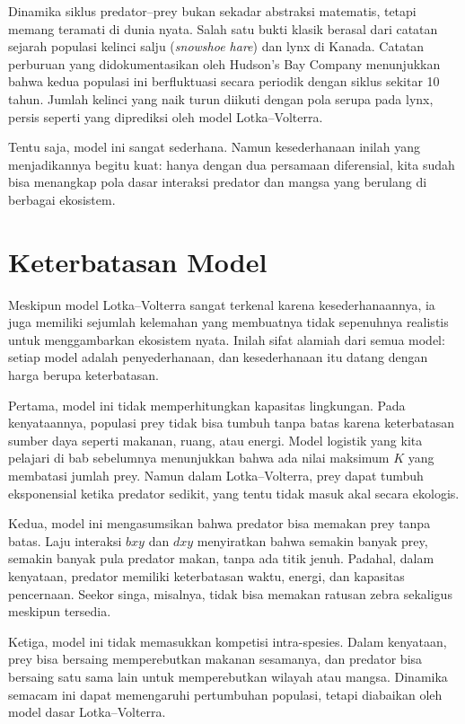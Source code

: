 \documentclass{bukumjh}
\begin{document}
Dinamika siklus predator–prey bukan sekadar abstraksi matematis, tetapi memang teramati di dunia nyata. Salah satu bukti klasik berasal dari catatan sejarah populasi kelinci salju (\textit{snowshoe hare}) dan lynx di Kanada. Catatan perburuan yang didokumentasikan oleh Hudson’s Bay Company menunjukkan bahwa kedua populasi ini berfluktuasi secara periodik dengan siklus sekitar 10 tahun. Jumlah kelinci yang naik turun diikuti dengan pola serupa pada lynx, persis seperti yang diprediksi oleh model Lotka–Volterra.

Tentu saja, model ini sangat sederhana. Namun kesederhanaan inilah yang menjadikannya begitu kuat: hanya dengan dua persamaan diferensial, kita sudah bisa menangkap pola dasar interaksi predator dan mangsa yang berulang di berbagai ekosistem.

\section{Keterbatasan Model}

Meskipun model Lotka–Volterra sangat terkenal karena kesederhanaannya, ia juga memiliki sejumlah kelemahan yang membuatnya tidak sepenuhnya realistis untuk menggambarkan ekosistem nyata. Inilah sifat alamiah dari semua model: setiap model adalah penyederhanaan, dan kesederhanaan itu datang dengan harga berupa keterbatasan.

Pertama, model ini tidak memperhitungkan {\jsg kapasitas lingkungan}. Pada kenyataannya, populasi prey tidak bisa tumbuh tanpa batas karena keterbatasan sumber daya seperti makanan, ruang, atau energi. Model logistik yang kita pelajari di bab sebelumnya menunjukkan bahwa ada nilai maksimum $K$ yang membatasi jumlah prey. Namun dalam Lotka–Volterra, prey dapat tumbuh eksponensial ketika predator sedikit, yang tentu tidak masuk akal secara ekologis.

Kedua, model ini mengasumsikan bahwa {\jsg predator bisa memakan prey tanpa batas}. Laju interaksi $bxy$ dan $dxy$ menyiratkan bahwa semakin banyak prey, semakin banyak pula predator makan, tanpa ada titik jenuh. Padahal, dalam kenyataan, predator memiliki keterbatasan waktu, energi, dan kapasitas pencernaan. Seekor singa, misalnya, tidak bisa memakan ratusan zebra sekaligus meskipun tersedia.

Ketiga, model ini {\jsg tidak memasukkan kompetisi intra-spesies}. Dalam kenyataan, prey bisa bersaing memperebutkan makanan sesamanya, dan predator bisa bersaing satu sama lain untuk memperebutkan wilayah atau mangsa. Dinamika semacam ini dapat memengaruhi pertumbuhan populasi, tetapi diabaikan oleh model dasar Lotka–Volterra.
\end{document}
